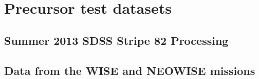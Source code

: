\documentclass[DM,lsstdraft,STS,toc]{lsstdoc}
\begin{document}




\appendix

\section{Precursor test datasets}

\subsection{Summer 2013 SDSS Stripe 82 Processing}

\subsection{Data from the WISE and NEOWISE missions}
\end{document}
